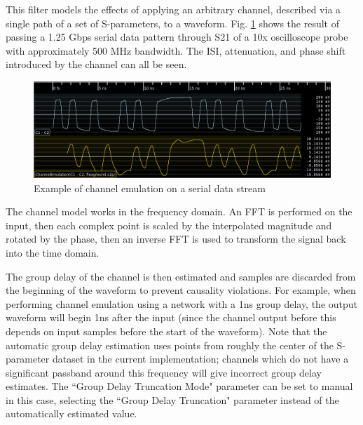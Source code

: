 This filter models the effects of applying an arbitrary channel, described via a single path of a set of S-parameters,
to a waveform. Fig. \ref{filter_channelemu} shows the result of passing a 1.25 Gbps serial data pattern through S21 of
a 10x oscilloscope probe with approximately 500 MHz bandwidth. The ISI, attenuation, and phase shift introduced by the
channel can all be seen.

\begin{figure}[h]
\centering
\includegraphics[width=16cm]{images/filters/channel-emulation.png}
\caption{Example of channel emulation on a serial data stream}
\label{filter_channelemu}
\end{figure}

The channel model works in the frequency domain. An FFT is performed on the input, then each complex point is scaled by
the interpolated magnitude and rotated by the phase, then an inverse FFT is used to transform the signal back into the
time domain.

The group delay of the channel is then estimated and samples are discarded from the beginning of the waveform to
prevent causality violations. For example, when performing channel emulation using a network with a 1ns group delay,
the output waveform will begin 1ns after the input (since the channel output before this depends on input samples
before the start of the waveform). Note that the automatic group delay estimation uses points from roughly the center
of the S-parameter dataset in the current implementation; channels which do not have a significant passband around this
frequency will give incorrect group delay estimates. The ``Group Delay Truncation Mode" parameter can be set to manual
in this case, selecting the ``Group Delay Truncation" parameter instead of the automatically estimated value.

